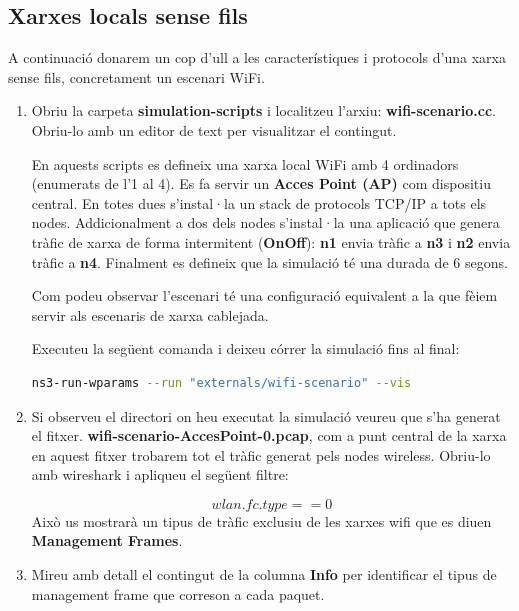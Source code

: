\documentclass[12pt,a4paper]{article}
\newcounter{exercises}
\newtheorem{exer}[exercises]{Pregunta}
\begin{document}
\subsection{Xarxes locals sense fils}
A continuació donarem un cop d'ull a les característiques i protocols d'una xarxa sense fils, concretament un escenari WiFi.
\begin{enumerate}

\item Obriu la carpeta \textbf{simulation-scripts} i localitzeu l'arxiu: \textbf{wifi-scenario.cc}. Obriu-lo amb un editor de text per visualitzar el contingut.

En aquests scripts es defineix una xarxa local WiFi amb 4 ordinadors (enumerats de l'1 al 4).
Es fa servir un \textbf{Acces Point (AP)} com dispositiu central. En totes dues s'instal·la un stack de protocols TCP/IP a tots els nodes.
Addicionalment a dos dels nodes s'instal·la una aplicació que genera tràfic de xarxa de forma intermitent (\textbf{OnOff}):
\textbf{n1} envia tràfic a \textbf{n3} i \textbf{n2} envia tràfic a \textbf{n4}.
Finalment es defineix que la simulació té una durada de 6 segons.

Com podeu observar l'escenari té una configuració equivalent a la que fèiem servir als escenaris de xarxa cablejada.

Executeu la següent comanda i deixeu córrer la simulació fins al final:
\begin{lstlisting}[language=bash]
   ns3-run-wparams --run "externals/wifi-scenario" --vis
\end{lstlisting}


\item Si observeu el directori on heu executat la simulació veureu que s'ha generat el fitxer. \textbf{wifi-scenario-AccesPoint-0.pcap}, com a punt
central de la xarxa en aquest fitxer trobarem tot el tràfic generat pels nodes wireless. Obriu-lo amb wireshark i apliqueu el següent filtre:

$$ wlan.fc.type == 0 $$ 
Això us mostrarà un tipus de tràfic exclusiu de les xarxes wifi que es diuen \textbf{Management Frames}.

\item Mireu amb detall el contingut de la columna \textbf{Info} per identificar el tipus de management frame que correson a cada paquet.


\end{enumerate}
\end{document}

